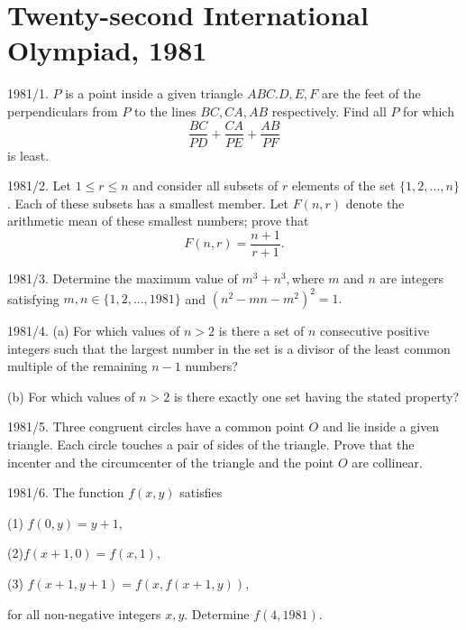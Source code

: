\documentclass[12pt,thmsa]{article}
\begin{document}
\section{Twenty-second International Olympiad, 1981}

1981/1. $P$ is a point inside a given triangle $ABC.D,E,F$ are the feet of
the perpendiculars from $P$ to the lines $BC,CA,AB$ respectively. Find all $%
P $ for which 
\[
\frac{BC}{PD}+\frac{CA}{PE}+\frac{AB}{PF} 
\]
is least.

1981/2. Let $1\le r\le n$ and consider all subsets of $r$ elements of the
set $\{1,2,...,n\}$. Each of these subsets has a smallest member. Let $%
F(n,r) $ denote the arithmetic mean of these smallest numbers; prove that 
\[
F(n,r)=\frac{n+1}{r+1}. 
\]

1981/3. Determine the maximum value of $m^{3}+n^{3},$where $m$ and $n$ are
integers satisfying $m,n\in \{1,2,...,1981\}$ and $(n^{2}-mn-m^{2})^{2}=1.$

1981/4. (a) For which values of $n>2$ is there a set of $n$ consecutive
positive integers such that the largest number in the set is a divisor of
the least common multiple of the remaining $n-1$ numbers?

(b) For which values of $n>2$ is there exactly one set having the stated
property?

1981/5. Three congruent circles have a common point $O$ and lie inside a
given triangle. Each circle touches a pair of sides of the triangle. Prove
that the incenter and the circumcenter of the triangle and the point $O$ are
collinear.

1981/6. The function $f(x,y)$ satisfies

(1) $f(0,y)=y+1,$

(2)$f(x+1,0)=f(x,1),$

(3) $f(x+1,y+1)=f(x,f(x+1,y)),$

for all non-negative integers $x,y.$ Determine $f(4,1981).$
\end{document}

